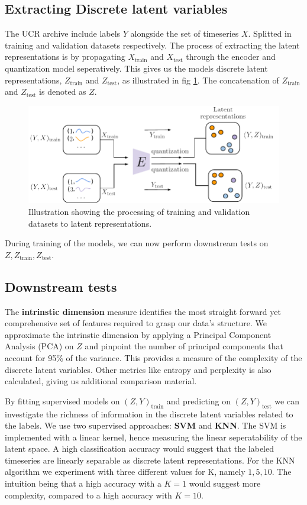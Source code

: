 \subsection{Extracting Discrete latent variables}
The UCR archive include labels $Y$ alongside the set of timeseries $X$. Splitted in training and validation datasets respectively. The process of extracting the latent representations is by propagating $X_\text{train}$ and $X_\text{test}$ through the encoder and quantization model seperatively. 
This gives us the models discrete latent representations, $Z_\text{train}$ and $Z_\text{test}$, as illustrated in fig \ref{fig:latents}. The concatenation of $Z_\text{train}$ and $Z_\text{test}$ is denoted as $Z$.

\begin{figure}[H]
    \includegraphics[scale=0.8]{figures/figure-pdf/Downstreams.pdf}
    \caption{Illustration showing the processing of training and validation datasets to latent representations.}
    \label{fig:latents}
\end{figure}

During training of the models, we can now perform downstream tests on $Z, Z_\text{train}, Z_\text{test}$.

\subsection{Downstream tests}
The \textbf{intrinstic dimension} measure identifies the most straight forward yet comprehensive set of features required to grasp our data's structure. We approximate the intrinstic dimension by applying a Principal Component Analysis (PCA) on $Z$ and pinpoint the number of principal components that account for 95\%
of the variance. This provides a measure of the complexity of the discrete latent variables. 
Other metrics like entropy and perplexity is also calculated, giving us additional comparison material.

By fitting supervised models on $(Z, Y)_\text{train}$ and predicting on $(Z, Y)_\text{test}$ we can investigate the richness of information in the discrete latent variables related to the labels.
We use two supervised approaches: \textbf{SVM} and \textbf{KNN}. The SVM is implemented with a linear kernel, hence measuring the linear seperatability of the latent space. A high classification accuracy would suggest that the labeled timeseries are linearly separable as discrete latent representations. 
For the KNN algorithm we experiment with three different values for K, namely $1, 5, 10$. The intuition being that a high accuracy with a $K=1$ would suggest more complexity, compared to a high accuracy with $K=10$.

